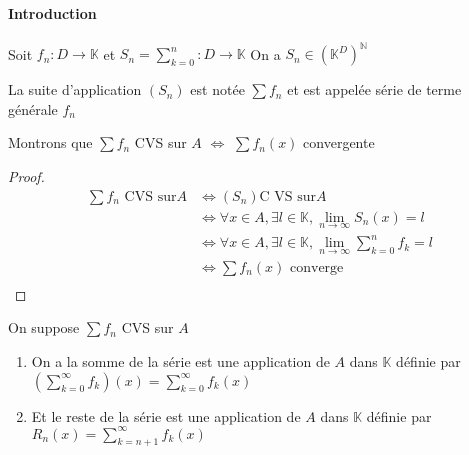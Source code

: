 \documentclass[11pt,hidelinks]{book}
\theoremstyle{mytheoremstyle}
\theoremstyle{mytheoremstyle}
\theoremstyle{mytheoremstyle}
\theoremstyle{mytheoremstyle}
\theoremstyle{mytheoremstyle}
\theoremstyle{mytheoremstyle}
\theoremstyle{mytheoremstyle}
\theoremstyle{mytheoremstyle}
\theoremstyle{myproblemstyle}
\def\mbb#1{\mathbb{#1}}
\def\bN{\mbb{N}}
\def\bK{\mbb{K}}
\def\ln{\lim_{n \to \infty}}
\newcommand{\func}[3]{#1\colon#2\to#3}
\begin{document}
    \paragraph{Introduction}
    Soit $\func{f_n}{D}{\bK}$ et $S_n = \sum^n_{k=0}\colon D \to \bK$
    On a $S_n \in \left(\bK^D\right)^{\bN}$
    \begin{definition}
        La suite d'application $(S_n)$ est notée $\sum f_n$ et est appelée série de terme générale $f_n$
    \end{definition}


\begin{adjustwidth}{-2em}{-1em}
     \begin{prop}
         Montrons que $\sum f_n$ CVS sur $A$ $\Leftrightarrow$ $\sum f_n(x)$ convergente
         \begin{proof}
             \begin{align*}
                \sum f_n \text{ CVS sur} A &\Leftrightarrow (S_n) \text{C VS sur} A \\
                                          &\Leftrightarrow \forall x \in A, \exists l \in \bK, \ln S_n(x) = l\\ 
                                          &\Leftrightarrow \forall x \in A, \exists l \in \bK, \ln \sum^{n}_{k=0} f_k = l\\ 
                                          &\Leftrightarrow \sum f_n(x) \text{ converge}\\ 
                \end{align*}        
         \end{proof}
     \end{prop}
\end{adjustwidth}
\begin{definition}
    On suppose $\sum f_n$ CVS sur $A$ 
    \begin{enumerate}
    \item On a la somme de la série est une application de $A$ dans $\bK$ définie par 
    $\left(\sum^{\infty}_{k=0} f_k\right) (x) = \sum^{\infty}_{k=0} f_k(x)$ 

    \item Et le reste de la série est une application de $A$ dans $\bK$ définie par 
    $R_n(x) = \sum_{k=n+1}^{\infty} f_k(x)$
    \end{enumerate}
\end{definition}
\end{document}
